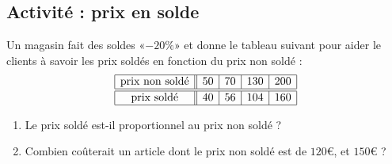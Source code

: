 \subsection*{Activité : prix en solde}

Un magasin fait des soldes «\( -20\%\)» et donne le tableau suivant pour aider le clients à savoir les prix soldés en fonction du prix non soldé :
\begin{equation*}
    \begin{array}[]{|c||c|c|c|c|}
        \hline
        \text{prix non soldé}&50&70&130&200\\
        \hline\hline
        \text{prix soldé}&40&56&104&160\\
        \hline
    \end{array}
\end{equation*}
\begin{enumerate}
    \item
        Le prix soldé est-il proportionnel au prix non soldé ?
    \item
        Combien coûterait un article dont le prix non soldé est de \( 120\)€, et \( 150\)€ ?
\end{enumerate}
